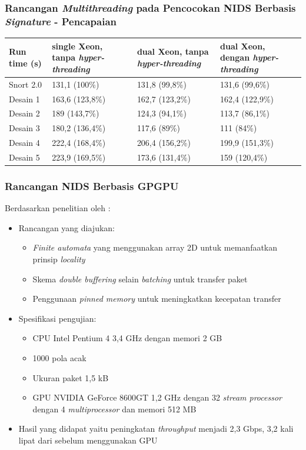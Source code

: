 \documentclass{beamer}
\begin{document}
  \begin{frame}
  \frametitle{Rancangan \emph{Multithreading} pada Pencocokan NIDS Berbasis \emph{Signature} - Pencapaian}
  \begin{table}
  \begin{tabular}{|p{1.5cm}|p{2.4cm}|p{2.4cm}|p{2.4cm}|}
  \toprule
  \textbf{Run time (s)} & {single Xeon, tanpa \emph{hyper-threading}} & {dual Xeon, tanpa \emph{hyper-threading}} & {dual Xeon, dengan \emph{hyper-threading}}\\
  \midrule
  Snort 2.0 & 131,1 (100\%) & 131,8 (99,8\%) & 131,6 (99,6\%) \\
  Desain 1 & 163,6 (123,8\%) & 162,7 (123,2\%) & 162,4 (122,9\%) \\
  Desain 2 & 189 (143,7\%) & 124,3 (94,1\%) & 113,7 (86,1\%) \\
  Desain 3 & 180,2 (136,4\%) & 117,6 (89\%) & 111 (84\%) \\
  Desain 4 & 222,4 (168,4\%) & 206,4 (156,2\%) & 199,9 (151,3\%) \\
  Desain 5 & 223,9 (169,5\%) & 173,6 (131,4\%) & 159 (120,4\%) \\
  \bottomrule
  \end{tabular}
  \end{table}
  \end{frame}


  \begin{frame}
  \frametitle{Rancangan NIDS Berbasis GPGPU}
  Berdasarkan penelitian oleh \cite{gnort2008}:
  \begin{itemize}
    \item Rancangan yang diajukan:
    \begin{itemize}
      \item \emph{Finite automata} yang menggunakan array 2D untuk memanfaatkan prinsip \emph{locality}
      \item Skema \emph{double buffering} selain \emph{batching} untuk transfer paket
      \item Penggunaan \emph{pinned memory} untuk meningkatkan kecepatan transfer
    \end{itemize}
    \item Spesifikasi pengujian:
    \begin{itemize}
      \item CPU Intel Pentium 4 3,4 GHz dengan memori 2 GB
      \item 1000 pola acak
      \item Ukuran paket 1,5 kB
      \item GPU NVIDIA GeForce 8600GT 1,2 GHz dengan 32 \emph{stream processor} dengan 4 \emph{multiprocessor} dan memori 512 MB
    \end{itemize}
    \item Hasil yang didapat yaitu peningkatan \emph{throughput} menjadi 2,3 Gbps, 3,2 kali lipat dari sebelum menggunakan GPU
  \end{itemize}
  \end{frame}
\end{document}
